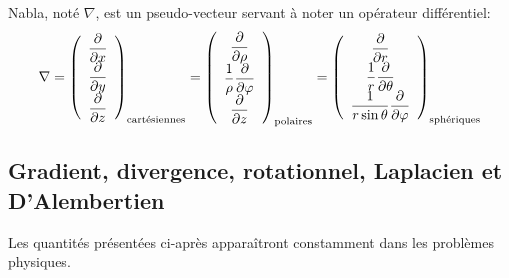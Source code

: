 \ifVersionDuDocEstVincent\medskip\fi
{} Nabla, noté $\nabla$, est un pseudo-vecteur  servant à noter un opérateur
différentiel:
\begin{equation}
\nabla  = \left( \begin{array}{c} {\dfrac\partial{\partial x}}\\ \dfrac\partial{\partial y}\\ \dfrac\partial{\partial z}
\end{array}\right)_{\text{cartésiennes}}
= \left( \begin{array}{c} \dfrac\partial{\partial \rho}\\ \dfrac1\rho \dfrac\partial{\partial \varphi}\\ \dfrac\partial{\partial z}
\end{array}\right)_{\text{polaires}}
= \left( \begin{array}{c} \dfrac\partial{\partial r}\\ \dfrac1r \dfrac\partial{\partial \theta}\\\dfrac1{r\sin\theta} \dfrac\partial{\partial \varphi}
\end{array}\right)_{\text{sphériques}}
\end{equation}

\ifVersionDuDocEstVincent\medskip\fi
\subsection{Gradient, divergence, rotationnel, Laplacien et D'Alembertien}
Les quantités présentées ci-après apparaîtront constamment dans les
problèmes physiques.%



